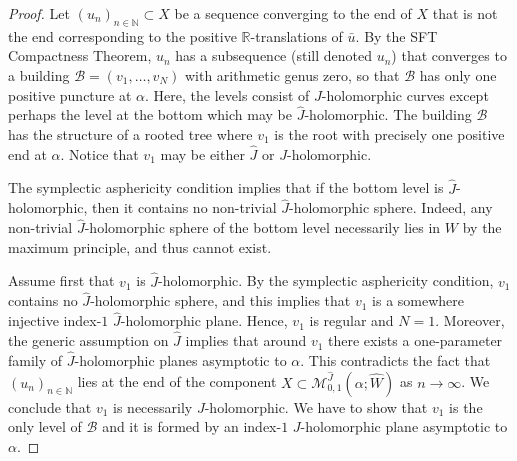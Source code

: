 \documentclass{amsart}
\newcommand{\R}{\mathbb{R}}
\newcommand{\N}{\mathbb{N}}
\begin{document}
\begin{proof}
Let $(u_n)_{n\in \N}\subset X$ be a sequence  converging to the end of $X$ that is not the end corresponding to the positive $\R$-translations of $\bar{u}$. By the SFT Compactness Theorem, $u_n$ has a subsequence (still denoted $u_n$) that converges to a building $\mathcal B=(v_1,\ldots,v_N)$ with arithmetic genus zero, so that $\mathcal B$ has only one positive puncture at $\alpha$. Here, the levels consist of $J$-holomorphic curves except perhaps the level at the bottom which may be $\widehat J$-holomorphic. The building $\mathcal B$ has the structure of a rooted tree where $v_1$ is the root with precisely one positive end at $\alpha$. Notice that $v_1$ may be either $\widehat J$ or $J$-holomorphic. 

The  symplectic asphericity condition implies that if the bottom level is   $\widehat J$-holomorphic, then it contains no non-trivial $\widehat J$-holomorphic sphere. Indeed, any non-trivial $\widehat J$-holomorphic sphere of the bottom level necessarily lies in $W$ by the maximum principle, and thus cannot exist.

Assume first that $v_1$ is $\widehat J$-holomorphic. By the symplectic asphericity condition,  $v_1$ contains no $\widehat J$-holomorphic sphere, and this implies that $v_1$ is a somewhere injective index-$1$ $\widehat J$-holomorphic plane.   Hence, $v_1$ is regular and $N=1$. Moreover, the generic assumption on $\widehat J$ implies that around $v_1$ there exists a one-parameter family of $\widehat J$-holomorphic planes asymptotic to $\alpha$. This contradicts the fact that $(u_n)_{n\in \N}$ lies at the end of the component $X\subset \mathcal M^{\widehat J}_{0,1}(\alpha ; \widehat W)$ as $n\to \infty$. We conclude that $v_1$ is necessarily $J$-holomorphic. We have to show that $v_1$ is the only level of $\mathcal B$ and it is formed by an index-$1$ $J$-holomorphic plane asymptotic to $\alpha$.


\end{proof}
\end{document}
